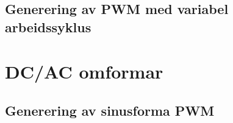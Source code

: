 \documentclass[10pt,a4paper]{article}
\begin{document}
	\subsection{Generering av PWM med variabel arbeidssyklus}
	
	
	\section{DC/AC omformar}
	
	
	\subsection{Generering av sinusforma PWM}
	
	
	
	

	

	
	
\end{document}

